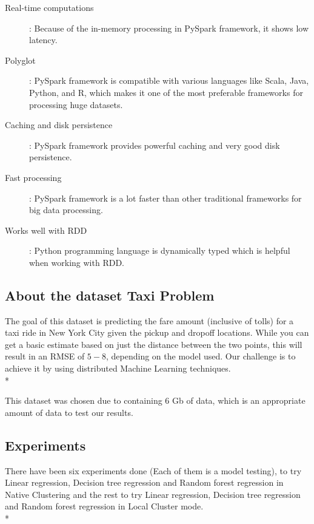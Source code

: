 \begin{description}
	\item [Real-time computations]: Because of the in-memory processing in PySpark framework, it shows low latency.
	\item [Polyglot]: PySpark framework is compatible with various languages like Scala, Java, Python, and R, which makes it one of the most preferable frameworks for processing huge datasets.
	\item [Caching and disk persistence]: PySpark framework provides powerful caching and very good disk persistence.
	\item [Fast processing]: PySpark framework is a lot faster than other traditional frameworks for big data processing.
	\item [Works well with RDD]: Python programming language is dynamically typed which is helpful when working with RDD.
\end{description}

\noindent
\subsection{About the dataset Taxi Problem \cite{taxiDataset}} 

The goal of this dataset is predicting the fare amount (inclusive of tolls) for a taxi ride in New York City given the pickup and dropoff locations. While you can get a basic estimate based on just the distance between the two points, this will result in an RMSE of $5-$8, depending on the model used. Our challenge is to achieve it by using distributed Machine Learning techniques.\\*

This dataset was chosen due to containing 6 Gb of data, which is an appropriate amount of data to test our results.

\subsection{Experiments }

There have been six experiments done (Each of them is a model testing), to try Linear regression, Decision tree regression and Random forest regression in Native Clustering and the rest to try Linear regression, Decision tree regression and Random forest regression in Local Cluster mode.\\*


